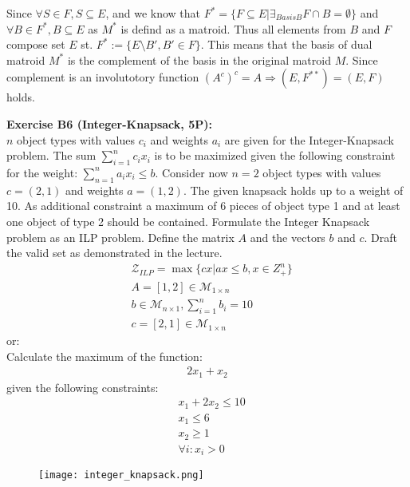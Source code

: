 \documentclass[12pt]{article}
\theoremstyle{definition}
\begin{document}
\begin{flushleft}
\begin{enumerate}[(a)]
\begin{itemize}
    \end{itemize}
    Since $ \forall S \in F, S \subseteq E$, and we know that $F^* = \{F \subseteq E | \exists_{Basis B} F \cap B = \emptyset\}$ and $ \forall B \in F^*, B \subseteq E $
    as $M^*$ is defind as a matroid. Thus all elements from $B$ and $F$ compose set $E$ st. $F^* := \{E \setminus B', B' \in F\}$. This means that the basis of dual matroid $M^*$
    is the complement of the basis in the original matroid $M$.
    \newline
    Since complement is an involutotory function ${\displaystyle \left(A^{c}\right)^{c}=A} \Longrightarrow (E, F^{**}) = (E, F)$ holds.
\end{enumerate}
\newpage
\textbf{Exercise B6 (Integer-Knapsack, 5P):} \\
$n$ object types with values $c_i$ and weights $a_i$ are given for the Integer-Knapsack problem. The sum $\sum_{i = 1} ^ n c_i x_i$ is to
be maximized given the following constraint for the weight: $\sum_{n = 1} ^ n a_i x_i \leq b$.
\newline
Consider now $n = 2$ object types with values $c = (2,1)$ and weights $a = (1,2)$. The given knapsack holds up to a weight of 10.
As additional constraint a maximum of 6 pieces of object type 1 and at least one object of type 2 should be contained.
Formulate the Integer Knapsack problem as an ILP problem. Define the matrix $A$ and the vectors $b$ and $c$. Draft 
the valid set as demonstrated in the lecture.
\begin{align*}
    & \mathcal{Z}_{ILP} = \max \{cx | ax \leq b, x \in Z_{+}^n\} \\
    & A = [1,2] \in \mathcal{M}_{1 \times n} \\
    & b \in \mathcal{M}_{n  \times 1}, \sum_{i = 1}^n b_i = 10 \\
    & c = [2,1] \in \mathcal{M}_{1 \times n} 
\end{align*}
or: \\
Calculate the maximum of the function:
\begin{align*}
    2x_1 + x_2 
\end{align*}
given the following constraints:
\begin{align}
    & x_1 + 2x_2 \leq 10 \\
    & x_1 \leq 6 \\
    & x_2 \geq 1 \\
    & \forall i: x_i > 0
\end{align}
\begin{figure}[H]
    \centering
    \texttt{[image: integer\_knapsack.png]}

\end{figure}
\end{flushleft}
\end{document}
